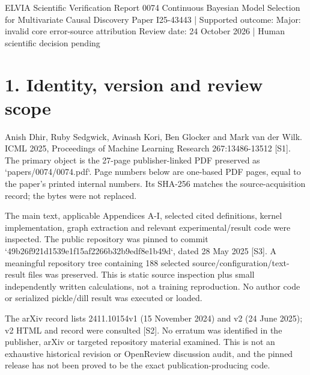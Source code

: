 \documentclass[10pt]{article}
\begin{document}
ELVIA Scientific Verification Report 0074
Continuous Bayesian Model Selection for Multivariate Causal Discovery
Paper I25-43443 | Supported outcome: Major: invalid core error-source attribution
Review date: 24 October 2026 | Human scientific decision pending\par
\section*{1. Identity, version and review scope}
Anish Dhir, Ruby Sedgwick, Avinash Kori, Ben Glocker and Mark van der Wilk. ICML 2025, Proceedings of Machine Learning Research 267:13486-13512 [S1]. The primary object is the 27-page publisher-linked PDF preserved as `papers/0074/0074.pdf`. Page numbers below are one-based PDF pages, equal to the paper’s printed internal numbers. Its SHA-256 matches the source-acquisition record; the bytes were not replaced.\par
The main text, applicable Appendices A-I, selected cited definitions, kernel implementation, graph extraction and relevant experimental/result code were inspected. The public repository was pinned to commit `49b26f921d1539e1f15af2266b32b9edf8e1b49d`, dated 28 May 2025 [S3]. A meaningful repository tree containing 188 selected source/configuration/text-result files was preserved. This is static source inspection plus small independently written calculations, not a training reproduction. No author code or serialized pickle/dill result was executed or loaded.\par
The arXiv record lists 2411.10154v1 (15 November 2024) and v2 (24 June 2025); v2 HTML and record were consulted [S2]. No erratum was identified in the publisher, arXiv or targeted repository material examined. This is not an exhaustive historical revision or OpenReview discussion audit, and the pinned release has not been proved to be the exact publication-producing code.\par
\end{document}
